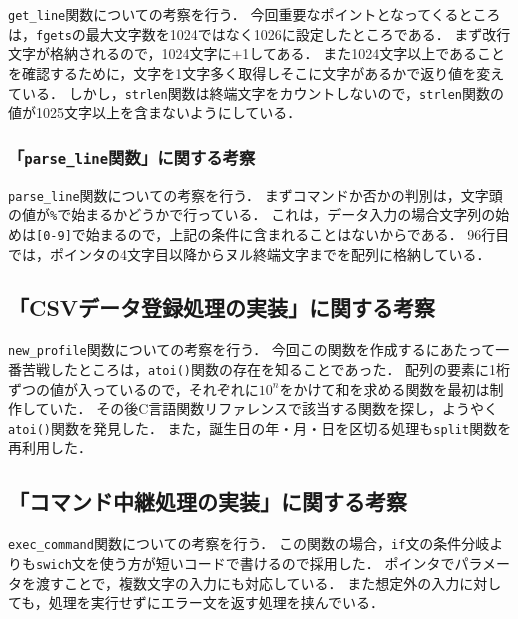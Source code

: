 \documentclass[autodetect-engine,dvi=dvipdfmx,ja=standard,
               a4j,11pt]{bxjsarticle}
\begin{document}
\verb|get_line|関数についての考察を行う．
今回重要なポイントとなってくるところは，\verb|fgets|の最大文字数を1024ではなく1026に設定したところである．
まず改行文字が格納されるので，1024文字に+1してある．
また1024文字以上であることを確認するために，文字を1文字多く取得しそこに文字があるかで返り値を変えている．
しかし，\verb|strlen|関数は終端文字をカウントしないので，\verb|strlen|関数の値が1025文字以上を含まないようにしている．

\subsubsection{「\texttt{parse\_line}関数」に関する考察}

\verb|parse_line|関数についての考察を行う．
まずコマンドか否かの判別は，文字頭の値が\verb|%|で始まるかどうかで行っている．
これは，データ入力の場合文字列の始めは\verb|[0-9]|で始まるので，上記の条件に含まれることはないからである．
96行目では，ポインタの4文字目以降からヌル終端文字までを配列に格納している．

\subsection{「CSVデータ登録処理の実装」に関する考察}

\verb|new_profile|関数についての考察を行う．
今回この関数を作成するにあたって一番苦戦したところは，\verb|atoi()|関数の存在を知ることであった．
配列の要素に1桁ずつの値が入っているので，それぞれに$10^n$をかけて和を求める関数を最初は制作していた．
その後C言語関数リファレンスで該当する関数を探し，ようやく\verb|atoi()|関数を発見した．
また，誕生日の年・月・日を区切る処理も\verb|split|関数を再利用した．

\subsection{「コマンド中継処理の実装」に関する考察}

\verb|exec_command|関数についての考察を行う．
この関数の場合，\verb|if|文の条件分岐よりも\verb|swich|文を使う方が短いコードで書けるので採用した．
ポインタでパラメータを渡すことで，複数文字の入力にも対応している．
また想定外の入力に対しても，処理を実行せずにエラー文を返す処理を挟んでいる．
\end{document}
